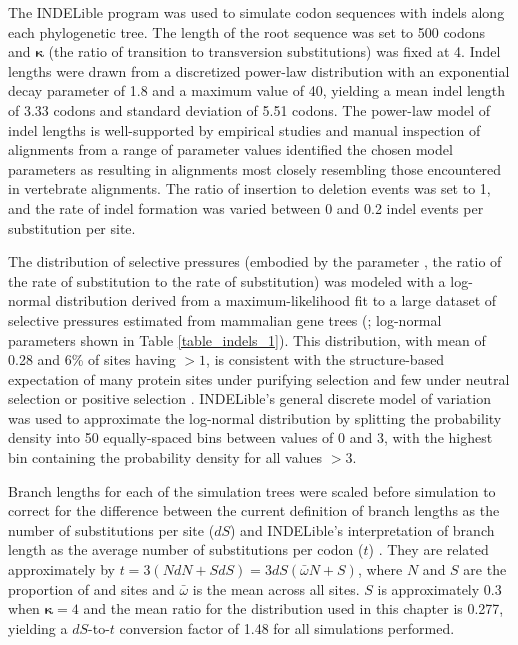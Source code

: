 The INDELible program \citep{Fletcher2009INDELible} was used to
simulate codon sequences with indels along each phylogenetic tree. The
length of the root sequence was set to 500 codons and $\bm{\kappa}$ (the
ratio of transition to transversion substitutions) was fixed at 4.
Indel lengths were drawn from a discretized
power-law distribution with an exponential decay parameter of 1.8 and
a maximum value of 40, yielding a mean indel length of 3.33 codons and
standard deviation of 5.51 codons. The power-law model of indel
lengths is well-supported by empirical studies
\citep{Benner1993Empirical,Cartwright2009Problems} and manual
inspection of alignments from a range of parameter values identified
the chosen model parameters as resulting in alignments most closely
resembling those encountered in vertebrate alignments. The ratio of
insertion to deletion events was set to 1, and the rate of indel
formation was varied between 0 and 0.2 indel events per substitution
per site.

The distribution of \sw selective pressures (embodied by the parameter
\omg, the ratio of the rate of \nsyn substitution to the
rate of \syn substitution) was modeled with a log-normal
distribution derived from a maximum-likelihood fit to a large dataset
of \sw selective pressures estimated from mammalian gene trees
(\citet{LindbladToh2011}; log-normal parameters shown in Table
\ref{table_indels_1}). This distribution, with mean \omg of 0.28 and 6\% of
sites having \omg$>1$, is consistent with the structure-based
expectation of many protein sites under purifying selection and few
under neutral selection or positive selection
\citep{Smith1970Natural,Kimura1974}. INDELible's general
discrete model of \sw \omg variation was used to approximate the
log-normal distribution by splitting the probability density into 50
equally-spaced bins between \omg values of 0 and 3, with the highest
bin containing the probability density for all values \omg$>3$.

Branch lengths for each of the simulation trees were scaled before
simulation to correct for the difference between the current definition of
branch lengths as the number of \syn substitutions per
\syn site ($dS$) and INDELible's interpretation of branch length
as the average number of substitutions per codon ($t$)
\citep{Fletcher2010}. They are related approximately by
$t=3(NdN+SdS) = 3dS(\bar{\omega}N+S)$, where $N$ and $S$ are the
proportion of \nsyn and \syn sites and $\bar{\omega}$ is
the mean \omg across all sites. $S$ is approximately 0.3 when
$\bm{\kappa}=4$ \citep{Yang1998a} and the mean \omg ratio
for the distribution used in this chapter is 0.277, yielding a $dS$-to-$t$
conversion factor of 1.48 for all simulations performed.

